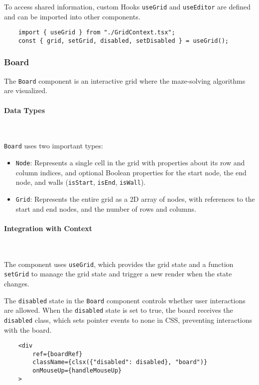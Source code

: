 To access shared information, custom Hooks \texttt{useGrid} and \texttt{useEditor} are defined and can be imported into other components.

\begin{verbatim}
    import { useGrid } from "./GridContext.tsx";
    const { grid, setGrid, disabled, setDisabled } = useGrid();
\end{verbatim}

\subsubsection{Board}
The \texttt{Board} component is an interactive grid where the maze-solving algorithms are visualized.

\paragraph{Data Types} \

\texttt{Board} uses two important types:
\begin{itemize}
    \item \texttt{Node}: Represents a single cell in the grid with properties about its row and column indices, and optional Boolean properties for the start node, the end node, and walls (\texttt{isStart}, \texttt{isEnd}, \texttt{isWall}).
    \item \texttt{Grid}: Represents the entire grid as a 2D array of nodes, with references to the start and end nodes, and the number of rows and columns.
\end{itemize}

\paragraph{Integration with Context} \

The component uses \texttt{useGrid}, which provides the grid state and a function \texttt{setGrid} to manage the grid state and trigger a new render when the state changes.

The \texttt{disabled} state in the \texttt{Board} component controls whether user interactions are allowed. When the \texttt{disabled} state is set to true, the board receives the \texttt{disabled} class, which sets pointer events to none in CSS, preventing interactions with the board.

\begin{verbatim}
    <div
        ref={boardRef}
        className={clsx({"disabled": disabled}, "board")}
        onMouseUp={handleMouseUp}
    >
\end{verbatim}

